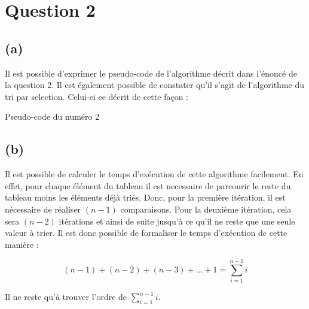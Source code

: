 \documentclass[12pt]{article}
\begin{document}
  \newpage

  \section*{Question 2}
  \subsection*{(a)}

    Il est possible d'exprimer le pseudo-code de l'algorithme décrit dans
    l'énoncé de la question 2. Il est également possible de constater qu'il
    s'agit de l'algorithme du tri par selection. Celui-ci ce décrit de cette
    façon : \newline

    \begin{algorithm}[H]
      \caption{Pseudo-code du numéro 2}
    \end{algorithm}

  \subsection*{(b)}

    Il est possible de calculer le temps d'exécution de cette algorithme
    facilement. En effet, pour chaque élément du tableau il est necessaire de
    parcourir le reste du tableau moins les éléments déjà triés. Donc, pour la
    première itération, il est nécessaire de réaliser \( (n - 1) \)
    comparaisons. Pour la deuxième itération, cela sera \( (n - 2) \) itérations
    et ainsi de suite jusqu'à ce qu'il ne reste que une seule valeur à trier. Il
    est donc possible de formaliser le temps d'exécution de cette manière :

    \[ (n - 1) + (n - 2) + (n - 3) + ... + 1 = \sum _ {i=1} ^ {n - 1} i \]

    \noindent Il ne reste qu'à trouver l'ordre de
    \( \sum _ {i=1} ^ {n - 1} i \). \newpage
\end{document}
